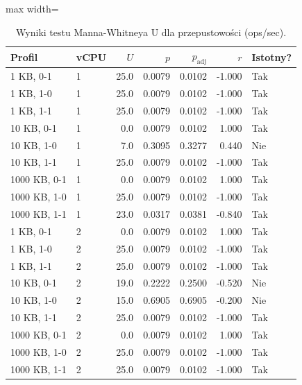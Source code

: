 \begin{table}[htbp]
\centering
\caption{Wyniki testu Manna-Whitneya U dla przepustowości (ops/sec).}
\label{tab:mann-whitney-ops}
\begin{adjustbox}{max width=\textwidth}
\begin{tabular}{llrrrrl}
\toprule
Profil & vCPU & $U$ & $p$ & $p_{\mathrm{adj}}$ & $r$ & Istotny? \\
\midrule
  1 KB, 0-1 & 1 & 25.0 & 0.0079 & 0.0102 & -1.000 & Tak \\
  1 KB, 1-0 & 1 & 25.0 & 0.0079 & 0.0102 & -1.000 & Tak \\
  1 KB, 1-1 & 1 & 25.0 & 0.0079 & 0.0102 & -1.000 & Tak \\
  10 KB, 0-1 & 1 & 0.0 & 0.0079 & 0.0102 & 1.000 & Tak \\
  10 KB, 1-0 & 1 & 7.0 & 0.3095 & 0.3277 & 0.440 & Nie \\
  10 KB, 1-1 & 1 & 25.0 & 0.0079 & 0.0102 & -1.000 & Tak \\
  1000 KB, 0-1 & 1 & 0.0 & 0.0079 & 0.0102 & 1.000 & Tak \\
  1000 KB, 1-0 & 1 & 25.0 & 0.0079 & 0.0102 & -1.000 & Tak \\
  1000 KB, 1-1 & 1 & 23.0 & 0.0317 & 0.0381 & -0.840 & Tak \\
  1 KB, 0-1 & 2 & 0.0 & 0.0079 & 0.0102 & 1.000 & Tak \\
  1 KB, 1-0 & 2 & 25.0 & 0.0079 & 0.0102 & -1.000 & Tak \\
  1 KB, 1-1 & 2 & 25.0 & 0.0079 & 0.0102 & -1.000 & Tak \\
  10 KB, 0-1 & 2 & 19.0 & 0.2222 & 0.2500 & -0.520 & Nie \\
  10 KB, 1-0 & 2 & 15.0 & 0.6905 & 0.6905 & -0.200 & Nie \\
  10 KB, 1-1 & 2 & 25.0 & 0.0079 & 0.0102 & -1.000 & Tak \\
  1000 KB, 0-1 & 2 & 0.0 & 0.0079 & 0.0102 & 1.000 & Tak \\
  1000 KB, 1-0 & 2 & 25.0 & 0.0079 & 0.0102 & -1.000 & Tak \\
  1000 KB, 1-1 & 2 & 25.0 & 0.0079 & 0.0102 & -1.000 & Tak \\
\bottomrule
\end{tabular}
\end{adjustbox}
\end{table}